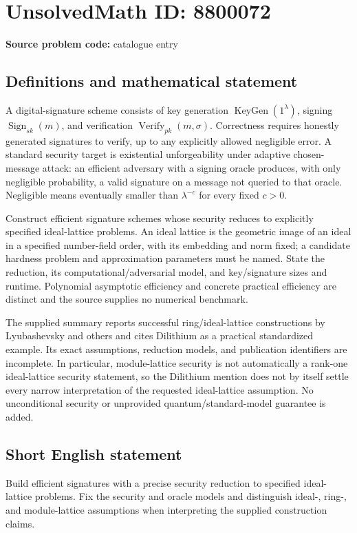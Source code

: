 \documentclass[11pt]{article}
\begin{document}
\section*{UnsolvedMath ID: 8800072}
\textbf{Source problem code:} catalogue entry
\subsection{Definitions and mathematical statement}
A digital-signature scheme consists of key generation $\operatorname{KeyGen}(1^\lambda)$, signing $\operatorname{Sign}_{sk}(m)$, and verification $\operatorname{Verify}_{pk}(m,\sigma)$. Correctness requires honestly generated signatures to verify, up to any explicitly allowed negligible error. A standard security target is existential unforgeability under adaptive chosen-message attack: an efficient adversary with a signing oracle produces, with only negligible probability, a valid signature on a message not queried to that oracle. Negligible means eventually smaller than $\lambda^{-c}$ for every fixed $c>0$.

Construct efficient signature schemes whose security reduces to explicitly specified ideal-lattice problems. An ideal lattice is the geometric image of an ideal in a specified number-field order, with its embedding and norm fixed; a candidate hardness problem and approximation parameters must be named. State the reduction, its computational/adversarial model, and key/signature sizes and runtime. Polynomial asymptotic efficiency and concrete practical efficiency are distinct and the source supplies no numerical benchmark.

The supplied summary reports successful ring/ideal-lattice constructions by Lyubashevsky and others and cites Dilithium as a practical standardized example. Its exact assumptions, reduction models, and publication identifiers are incomplete. In particular, module-lattice security is not automatically a rank-one ideal-lattice security statement, so the Dilithium mention does not by itself settle every narrow interpretation of the requested ideal-lattice assumption. No unconditional security or unprovided quantum/standard-model guarantee is added.
\subsection{Short English statement}
Build efficient signatures with a precise security reduction to specified ideal-lattice problems. Fix the security and oracle models and distinguish ideal-, ring-, and module-lattice assumptions when interpreting the supplied construction claims.
\end{document}
